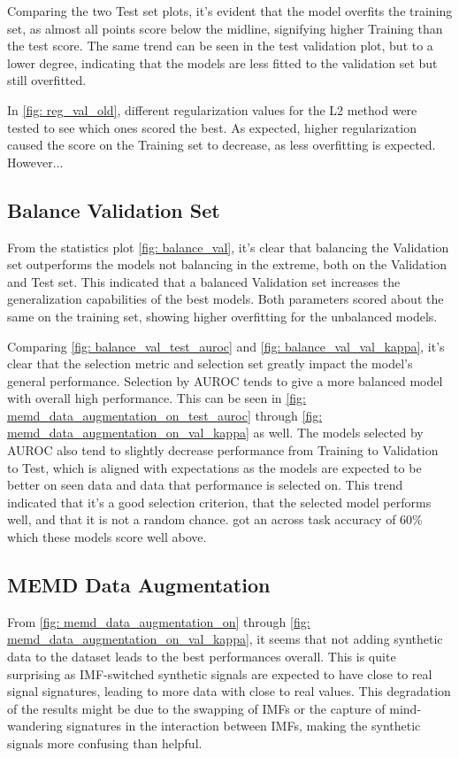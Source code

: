 Comparing the two Test set plots, it's evident that the model overfits the training set, as almost all points score below the midline, signifying higher Training than the test score. The same trend can be seen in the test validation plot, but to a lower degree, indicating that the models are less fitted to the validation set but still overfitted.

In \autoref{fig: reg_val_old}, different regularization values for the L2 method were tested to see which ones scored the best. As expected, higher regularization caused the score on the Training set to decrease, as less overfitting is expected. However...

\subsection{Balance Validation Set}
From the statistics plot \autoref{fig: balance_val}, it's clear that balancing the Validation set outperforms the models not balancing in the extreme, both on the Validation and Test set. This indicated that a balanced Validation set increases the generalization capabilities of the best models. Both parameters scored about the same on the training set, showing higher overfitting for the unbalanced models. 

Comparing \autoref{fig: balance_val_test_auroc} and \autoref{fig: balance_val_val_kappa}, it's clear that the selection metric and selection set greatly impact the model's general performance. Selection by AUROC tends to give a more balanced model with overall high performance. This can be seen in \autoref{fig: memd_data_augmentation_on_test_auroc} through \autoref{fig: memd_data_augmentation_on_val_kappa} as well. The models selected by AUROC also tend to slightly decrease performance from Training to Validation to Test, which is aligned with expectations as the models are expected to be better on seen data and data that performance is selected on. This trend indicated that it's a good selection criterion, that the selected model performs well, and that it is not a random chance. \cite{Jin2019PredictingMW} got an across task accuracy of 60\% which these models score well above. 
\subsection{MEMD Data Augmentation}
From \autoref{fig: memd_data_augmentation_on} through \autoref{fig: memd_data_augmentation_on_val_kappa}, it seems that not adding synthetic data to the dataset leads to the best performances overall. This is quite surprising as IMF-switched synthetic signals are expected to have close to real signal signatures, leading to more data with close to real values. This degradation of the results might be due to the swapping of IMFs or the capture of mind-wandering signatures in the interaction between IMFs, making the synthetic signals more confusing than helpful.
